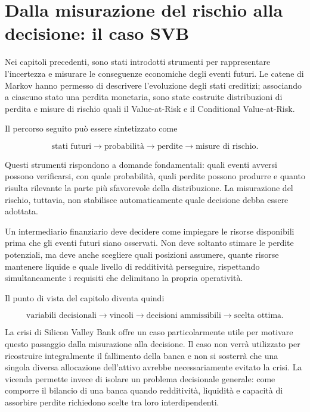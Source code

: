 \section{Dalla misurazione del rischio alla decisione: il caso SVB}

\label{sec:cap11-svb-decisione}

Nei capitoli precedenti, sono stati introdotti strumenti per rappresentare
l'incertezza e misurare le conseguenze economiche degli eventi futuri. Le
catene di Markov hanno permesso di descrivere l'evoluzione degli stati
creditizi; associando a ciascuno stato una perdita monetaria, sono state
costruite distribuzioni di perdita e misure di rischio quali il
Value-at-Risk e il Conditional Value-at-Risk.

Il percorso seguito pu\`{o} essere sintetizzato come

\[
\text{stati futuri}
\longrightarrow
\text{probabilit\`{a}}
\longrightarrow
\text{perdite}
\longrightarrow
\text{misure di rischio}.
\]

Questi strumenti rispondono a domande fondamentali: quali eventi avversi
possono verificarsi, con quale probabilit\`{a}, quali perdite possono
produrre e quanto risulta rilevante la parte pi\`{u} sfavorevole della
distribuzione. La misurazione del rischio, tuttavia, non stabilisce
automaticamente quale decisione debba essere adottata.

Un intermediario finanziario deve decidere come impiegare le risorse
disponibili prima che gli eventi futuri siano osservati. Non deve soltanto
stimare le perdite potenziali, ma deve anche scegliere quali posizioni
assumere, quante risorse mantenere liquide e quale livello di
redditivit\`{a} perseguire, rispettando simultaneamente i requisiti che
delimitano la propria operativit\`{a}.

Il punto di vista del capitolo diventa quindi

\[
\text{variabili decisionali}
\longrightarrow
\text{vincoli}
\longrightarrow
\text{decisioni ammissibili}
\longrightarrow
\text{scelta ottima}.
\]

La crisi di Silicon Valley Bank offre un caso particolarmente utile per
motivare questo passaggio dalla misurazione alla decisione. Il caso non
verr\`{a} utilizzato per ricostruire integralmente il fallimento della
banca e non si sosterr\`{a} che una singola diversa allocazione
dell'attivo avrebbe necessariamente evitato la crisi. La vicenda permette
invece di isolare un problema decisionale generale: come comporre il
bilancio di una banca quando redditivit\`{a}, liquidit\`{a} e
capacit\`{a} di assorbire perdite richiedono scelte tra loro
interdipendenti.

